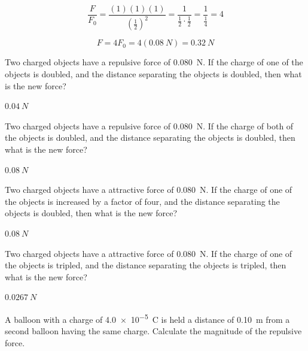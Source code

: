 \documentclass[]{exam}
\begin{document}
\begin{questions}
\begin{solution}
\begin{equation*}
    \frac{F}{F_0} = \frac{(1)(1)(1)}{\left(\frac{1}{2}\right)^2} = \frac{1}{\frac{1}{2}\cdot\frac{1}{2}} = \frac{1}{\frac{1}{4}} = 4
\end{equation*}

\begin{equation*}
    F = 4 F_0 = 4(\SI{0.08}{N}) = \boxed{\SI{0.32}{N}}
\end{equation*}
\end{solution}

\question
Two charged objects have a repulsive force of \SI{0.080}{N}. If the charge of one of the objects is doubled, and the distance separating the objects is doubled, then what is the new force?

\begin{solution}
$\SI{0.04}{N}$
\end{solution}


\question
Two charged objects have a repulsive force of \SI{0.080}{N}. If the charge of both of the objects is doubled, and the distance separating the objects is doubled, then what is the new force?

\begin{solution}
$\SI{0.08}{N}$
\end{solution}

\question
Two charged objects have a attractive force of \SI{0.080}{N}. If the charge of one of the objects is increased by a factor of four, and the distance separating the objects is doubled, then what is the new force?

\begin{solution}
$\SI{0.08}{N}$
\end{solution}

\question
Two charged objects have a attractive force of \SI{0.080}{N}. If the charge of one of the objects is tripled, and the distance separating the objects is tripled, then what is the new force?

\begin{solution}
$\SI{0.0267}{N}$
\end{solution}








\question
A balloon with a charge of \SI{4.0e-5}{C} is held a distance of \SI{0.10}{m} from a second balloon having the same charge. Calculate the magnitude of the repulsive force.


\end{questions}
\end{document}

